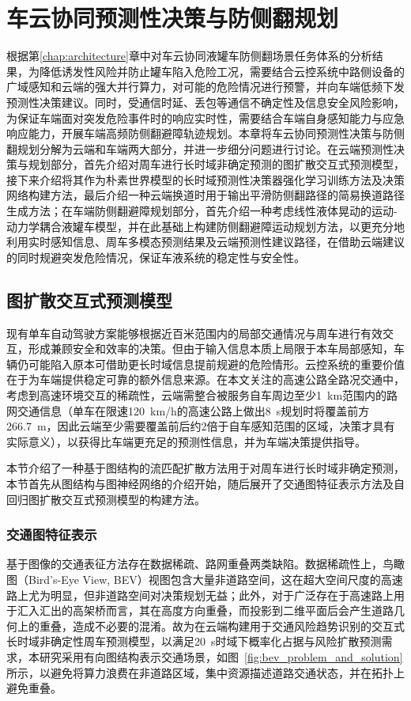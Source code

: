 
\chapter{车云协同预测性决策与防侧翻规划}
\label{chap03_vehicle_cloud_collaborate}
根据第\ref{chap:architecture}章中对车云协同液罐车防侧翻场景任务体系的分析结果，为降低诱发性风险并防止罐车陷入危险工况，需要结合云控系统中路侧设备的广域感知和云端的强大并行算力，对可能的危险情况进行预警，并向车端低频下发预测性决策建议。同时，受通信时延、丢包等通信不确定性及信息安全风险影响，为保证车端面对突发危险事件时的响应实时性，需要结合车端自身感知能力与应急响应能力，开展车端高频防侧翻避障轨迹规划。本章将车云协同预测性决策与防侧翻规划分解为云端和车端两大部分，并进一步细分问题进行讨论。在云端预测性决策与规划部分，首先介绍对周车进行长时域非确定预测的图扩散交互式预测模型，接下来介绍将其作为朴素世界模型的长时域预测性决策器强化学习训练方法及决策网络构建方法，最后介绍一种云端换道时用于输出平滑防侧翻路径的简易换道路径生成方法；在车端防侧翻避障规划部分，首先介绍一种考虑线性液体晃动的运动-动力学耦合液罐车模型，并在此基础上构建防侧翻避障运动规划方法，以更充分地利用实时感知信息、周车多模态预测结果及云端预测性建议路径，在借助云端建议的同时规避突发危险情况，保证车液系统的稳定性与安全性。


\section{图扩散交互式预测模型}
\label{sec:graphflow}
现有单车自动驾驶方案能够根据近百米范围内的局部交通情况与周车进行有效交互，形成兼顾安全和效率的决策。但由于输入信息本质上局限于本车局部感知，车辆仍可能陷入原本可借助更长时域信息提前规避的危险情形。云控系统的重要价值在于为车端提供稳定可靠的额外信息来源。在本文关注的高速公路全路况交通中，考虑到高速环境交互的稀疏性，云端需整合被服务自车周边至少\SI{1}{km}范围内的路网交通信息（单车在限速\SI{120}{km/h}的高速公路上做出\SI{8}{s}规划时将覆盖前方\SI{266.7}{m}，因此云端至少需要覆盖前后约2倍于自车感知范围的区域，决策才具有实际意义），以获得比车端更充足的预测性信息，并为车端决策提供指导。

本节介绍了一种基于图结构的流匹配扩散方法用于对周车进行长时域非确定预测，本节首先从图结构与图神经网络的介绍开始，随后展开了交通图特征表示方法及自回归图扩散交互式预测模型的构建方法。

      
  \subsection{交通图特征表示}
    \label{sec:traffic_graph_representation}
    基于图像的交通表征方法存在数据稀疏、路网重叠两类缺陷。数据稀疏性上，鸟瞰图（Bird's-Eye View, BEV）视图包含大量非道路空间，这在超大空间尺度的高速路上尤为明显，但非道路空间对决策规划无益；此外，对于广泛存在于高速路上用于汇入汇出的高架桥而言，其在高度方向重叠，而投影到二维平面后会产生道路几何上的重叠，造成不必要的混淆。故为在云端构建用于交通风险趋势识别的交互式长时域非确定性周车预测模型，以满足\SI{20}{s}时域下概率化占据与风险扩散预测需求，本研究采用有向图结构表示交通场景，如图~\ref{fig:bev_problem_and_solution}所示，以避免将算力浪费在非道路区域，集中资源描述道路交通状态，并在拓扑上避免重叠。

